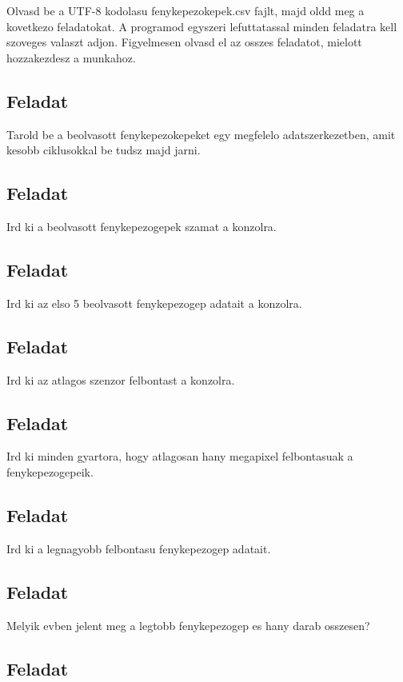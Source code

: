\documentclass{article}
\begin{document}
Olvasd be a UTF-8 kodolasu fenykepezokepek.csv fajlt, majd oldd meg a kovetkezo feladatokat. A programod egyszeri lefuttatassal minden feladatra kell szoveges valaszt adjon. Figyelmesen olvasd el az osszes feladatot, mielott hozzakezdesz a munkahoz.

\subsection{Feladat}
Tarold be a beolvasott fenykepezokepeket egy megfelelo adatszerkezetben, amit kesobb ciklusokkal be tudsz majd jarni.

\subsection{Feladat}

Ird ki a beolvasott fenykepezogepek szamat a konzolra.

\subsection{Feladat}

Ird ki az elso 5 beolvasott fenykepezogep adatait a konzolra.

\subsection{Feladat}

Ird ki az atlagos szenzor felbontast a konzolra.

\subsection{Feladat}

Ird ki minden gyartora, hogy atlagosan hany megapixel felbontasuak a fenykepezogepeik.

\subsection{Feladat}

Ird ki a legnagyobb felbontasu fenykepezogep adatait.

\subsection{Feladat}

Melyik evben jelent meg a legtobb fenykepezogep es hany darab osszesen?

\subsection{Feladat}
\end{document}
